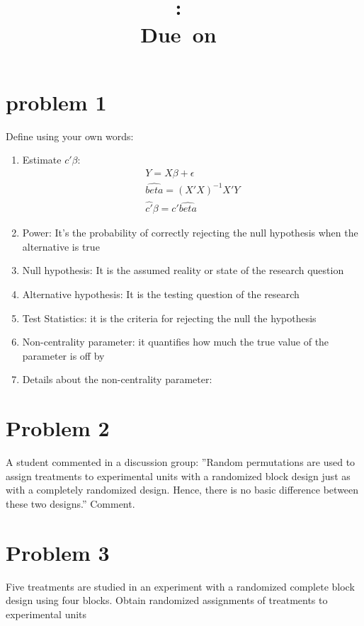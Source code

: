 \documentclass{article}
\title{
	\vspace{2in}
	\textmd{\textbf{\hmwkClass:\ \hmwkTitle}}\\
	\normalsize\vspace{0.1in}\small{Due\ on\ \hmwkDueDate}\\
	\vspace{0.1in}\large{\textit{\hmwkClassInstructor}}
	\vspace{3in}
}
\author{\hmwkAuthorName}
\date{}
\begin{document}
\maketitle
\pagebreak
\tableofcontents
\pagebreak

\section{problem 1}
Define using your own words:
\begin{enumerate}
	\item Estimate $c'\beta$:
	      \[
		      \begin{split}
			      Y = X\beta + \epsilon      \\
			      \hat{beta} = (X'X)^{-1}X'Y \\
			      \hat{c'}\beta = c'\hat{beta}
		      \end{split}
	      \]
	\item Power: It's the probability of correctly rejecting the null hypothesis when the alternative is true
	\item Null hypothesis: It is the assumed reality or state of the research question
	\item Alternative hypothesis: It is the testing question of the research
	\item Test Statistics: it is the criteria for rejecting the null the hypothesis
	\item Non-centrality parameter: it quantifies how much the true value of the parameter is off by
	\item Details about the non-centrality parameter:
\end{enumerate}

\section{Problem 2}
A student commented in a discussion group: ”Random permutations are used to assign treatments
to experimental units with a randomized block design just as with a completely randomized design.
Hence, there is no basic difference between these two designs.” Comment.

\section{Problem 3}
Five treatments are studied in an experiment with a randomized complete block design using four
blocks. Obtain randomized assignments of treatments to experimental units
\end{document}
